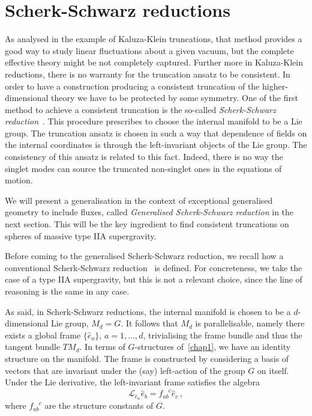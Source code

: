 \documentclass[debug]{phd}
\begin{document}
		\section{Scherk-Schwarz reductions}
				As analysed in the example of Kaluza-Klein truncations, that method provides a good way to study linear fluctuations about a given vacuum, but the complete effective theory might be not completely captured.
				Further more in Kaluza-Klein reductions, there is no warranty for the truncation ansatz to be consistent.
				In order to have a construction producing a consistent truncation of the higher-dimensional theory we have to be protected by some symmetry.
				One of the first method to achieve a consistent truncation is the so-called \emph{Scherk-Schwarz reduction}~\cite{Scherk:1979zr}.
				This procedure prescribes to choose the internal manifold to be a Lie group.
				The truncation ansatz is chosen in such a way that dependence of fields on the internal coordinates is through the left-invariant objects of the Lie group.
				The consistency of this ansatz is related to this fact.
				Indeed, there is no way the singlet modes can source the truncated non-singlet ones in the equations of motion.
				
				We will present a generalisation in the context of exceptional generalised geometry to include fluxes, called \emph{Generalised Scherk-Schwarz reduction} in the next section. 
				This will be the key ingredient to find consistent truncations on spheres of massive type IIA supergravity.
				
				Before coming to the generalised Scherk-Schwarz reduction, we recall how a conventional Scherk-Schwarz reduction~\cite{Scherk:1979zr} is defined.
				For concreteness, we take the case of a type IIA supergravity, but this is not a relevant choice, since the line of reasoning is the same in any case.
				
				As said, in Scherk-Schwarz reductions, the internal manifold is chosen to be a $d$-dimensional Lie group, $M_d = G$. 
				It follows that $M_d$ is parallelisable, namely there exists a global frame $\{\hat{e}_a\}$, $a=1,\ldots,d$, trivialising the frame bundle and thus the tangent bundle $TM_d$.
				In terms of $G$-structures of~\cref{chap1}, we have an identity structure on the manifold. 
				The frame is constructed by considering a basis of vectors that are invariant under the (say) left-action of the group $G$ on itself. 
				Under the Lie derivative, the left-invariant frame satisfies the algebra
						\begin{equation}
							\mathcal{L}_{\hat{e}_a}\hat{e}_b = f_{ab}^{\phantom{ab}c} \hat{e}_c\, ,
						\end{equation}
				where $f_{ab}^{\phantom{ab}c}$ are the structure constants of $G$.
				
\end{document}
